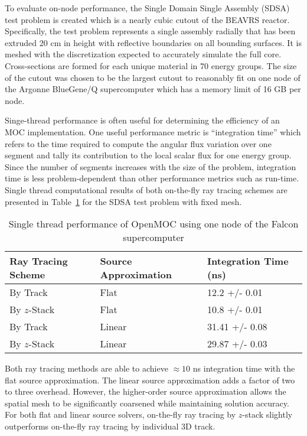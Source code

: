 \documentclass[12pt,twoside]{mitthesis-exec}
\begin{document}

To evaluate on-node performance, the Single Domain Single Assembly (SDSA) test problem is created which is a nearly cubic cutout of the BEAVRS reactor. Specifically, the test problem represents a single assembly radially that has been extruded 20 cm in height with reflective boundaries on all bounding surfaces. It is meshed with the discretization expected to accurately simulate the full core. Cross-sections are formed for each unique material in 70 energy groups. The size of the cutout was chosen to be the largest cutout to reasonably fit on one node of the Argonne BlueGene/Q supercomputer which has a memory limit of 16 GB per node.

Singe-thread performance is often useful for determining the efficiency of an MOC implementation. One useful performance metric is ``integration time'' which refers to the time required to compute the angular flux variation over one segment and tally its contribution to the local scalar flux for one energy group. Since the number of segments increases with the size of the problem, integration time is less problem-dependent than other performance metrics such as run-time. Single thread computational results of both on-the-fly ray tracing schemes are presented in Table~\ref{tab:rt-single-thread} for the SDSA test problem with fixed mesh.

\begin{table}[ht]
	\centering
	\caption{Single thread performance of OpenMOC using one node of the Falcon supercomputer}
	\medskip
	\begin{tabular}{l|l|l}
		\hline
		Ray Tracing Scheme & Source Approximation & Integration Time (ns) \\
		\hline
		By Track  & Flat & 12.2 +/- 0.01 \\
		By $z$-Stack & Flat & 10.8 +/- 0.01 \\
		\hline
		By Track  & Linear & 31.41 +/- 0.08 \\
		By $z$-Stack & Linear & 29.87 +/- 0.03 \\
		\hline
	\end{tabular}
	\label{tab:rt-single-thread}
\end{table}

Both ray tracing methods are able to achieve $\approx 10$ ns integration time with the flat source approximation. The linear source approximation adds a factor of two to three overhead. However, the higher-order source approximation allows the spatial mesh to be significantly coarsened while maintaining solution accuracy. For both flat and linear source solvers, on-the-fly ray tracing by $z$-stack slightly outperforms on-the-fly ray tracing by individual 3D track. 
\end{document}

